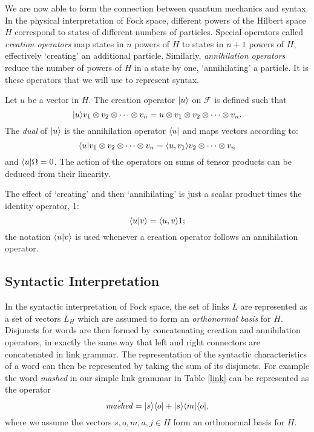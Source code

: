 

We are now able to form the connection between quantum mechanics and syntax.
In the physical interpretation of Fock space, different powers of the Hilbert space $H$ correspond to states of different numbers of particles. Special operators called \emph{creation operators} map states in $n$ powers of $H$ to states in $n+1$ powers of $H$, effectively `creating' an additional particle. Similarly, \emph{annihilation operators} reduce the number of powers of $H$ in a state by one, `annihilating' a particle. It is these operators that we will use to represent syntax.

Let $u$ be a vector in $H$. The creation operator $|u \rangle$ on $\mathcal{F}$ is defined such that
$$|u \rangle v_1\otimes v_2 \otimes \cdots \otimes v_n = u \otimes v_1\otimes v_2 \otimes \cdots \otimes v_n.$$
The \emph{dual} of $|u \rangle$ is the annihilation operator $\langle u|$ and maps vectors according to:
$$\langle u|v_1\otimes v_2 \otimes \cdots \otimes v_n = \langle u, v_1 \rangle v_2 \otimes \cdots \otimes v_n$$
and $\langle u|\Omega = 0$. The action of the operators on sums of tensor products can be deduced from their linearity.

The effect of `creating' and then `annihilating' is just a scalar product times the identity operator, 1:
$$\langle u| v\rangle = \langle u, v \rangle1;$$
the notation $\langle u| v\rangle$ is used whenever a creation operator follows an annihilation operator.


\subsection{Syntactic Interpretation}
\label{link-context-1}

In the syntactic interpretation of Fock space, the set of links $L$ are represented as a set of vectors $L_H$ which are assumed to form an \emph{orthonormal basis} for $H$. Disjuncts for words are then formed by concatenating creation and annihilation operators, in exactly the same way that left and right connectors are concatenated in link grammar. The representation of the syntactic characteristics of a word can then be represented by taking the sum of its disjuncts. For example the word \emph{mashed} in our simple link grammar in Table \ref{link} can be represented as the operator
$$\hat{\mathit{mashed}} = |s \rangle\langle o| + |s \rangle\langle m|\langle o|,$$
where we assume the vectors $s,o,m,a,j \in H$ form an orthonormal basis for $H$.


